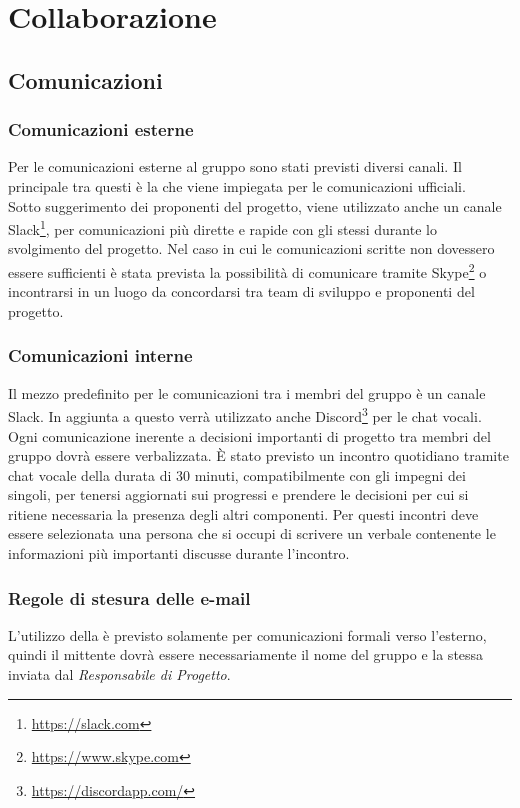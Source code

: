 \section{Collaborazione}
\subsection{Comunicazioni}
\subsubsection{Comunicazioni esterne}
Per le comunicazioni esterne al gruppo sono stati previsti diversi canali.
Il principale tra questi è la \email\space \href{mailto:\GroupEmail}{\GroupEmail}\space che viene impiegata per le comunicazioni ufficiali.\\
Sotto suggerimento dei proponenti del progetto, viene utilizzato anche un canale Slack\texttrademark\footnote{\url{https://slack.com}}, per comunicazioni più dirette e rapide con gli stessi durante lo svolgimento del progetto. Nel caso in cui le comunicazioni scritte non dovessero essere sufficienti è stata prevista la possibilità di comunicare tramite Skype\texttrademark\footnote{\url{https://www.skype.com}} o incontrarsi in un luogo da concordarsi tra team di sviluppo e proponenti del progetto.

\subsubsection{Comunicazioni interne}
Il mezzo predefinito per le comunicazioni tra i membri del gruppo è un canale Slack\texttrademark.
In aggiunta a questo verrà utilizzato anche Discord\texttrademark\footnote{\url{https://discordapp.com/}} per le chat vocali.
Ogni comunicazione inerente a decisioni importanti di progetto tra membri del gruppo dovrà essere verbalizzata.
È stato previsto un incontro quotidiano tramite chat vocale della durata di 30 minuti, compatibilmente con gli impegni dei singoli, per tenersi aggiornati sui progressi e prendere le decisioni per cui si ritiene necessaria la presenza degli altri componenti. Per questi incontri deve essere selezionata una persona che si occupi di scrivere un verbale contenente le informazioni più importanti discusse durante l'incontro.

\subsubsection{Regole di stesura delle e-mail}
L'utilizzo della \email\space è previsto solamente per comunicazioni formali verso l'esterno, quindi il mittente dovrà essere necessariamente il nome del gruppo e la stessa \email\space inviata dal \textit{Responsabile di Progetto}.

